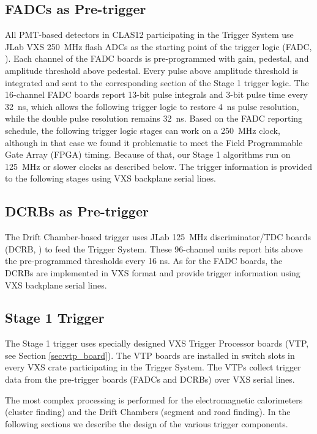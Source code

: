 \subsection{FADCs as Pre-trigger}

All PMT-based detectors in CLAS12 participating in the Trigger System use JLab VXS 250~MHz flash ADCs as the starting point of the trigger logic (FADC, \cite{daq-ref}). Each channel of the FADC boards is pre-programmed with gain, pedestal, and amplitude threshold above pedestal. Every pulse above amplitude threshold is integrated and sent to the corresponding section of the Stage 1 trigger logic. The 16-channel FADC boards report 13-bit pulse integrals and 3-bit pulse time every 32~ns, which allows the following trigger logic to restore 4~ns pulse resolution, while the double pulse resolution remains 32~ns. Based on the FADC reporting schedule, the following trigger logic stages can work on a 250~MHz clock, although in that case we found it problematic to meet the Field Programmable Gate Array (FPGA) timing. Because of that, our Stage 1 algorithms run on 125~MHz or slower clocks as described below. The trigger information is provided to the following stages using VXS backplane serial lines.


\subsection{DCRBs as Pre-trigger}

The Drift Chamber-based trigger uses JLab 125~MHz discriminator/TDC boards (DCRB, \cite{daq-ref}) to feed the Trigger System. These 96-channel units report hits above the pre-programmed thresholds every 16 ns. As for the FADC boards, the DCRBs are implemented in VXS format and provide trigger information using VXS backplane serial lines.


\subsection{Stage 1 Trigger} 

The Stage 1 trigger uses specially designed VXS Trigger Processor boards (VTP, see Section \ref*{sec:vtp_board}). The VTP boards are installed in switch slots in every VXS crate participating in the Trigger System. The VTPs collect trigger data from the pre-trigger boards (FADCs and DCRBs) over VXS serial lines.

The most complex processing is performed for the electromagnetic calorimeters (cluster finding) and the Drift Chambers (segment and road finding). In the following sections we describe the design of the various trigger components.


